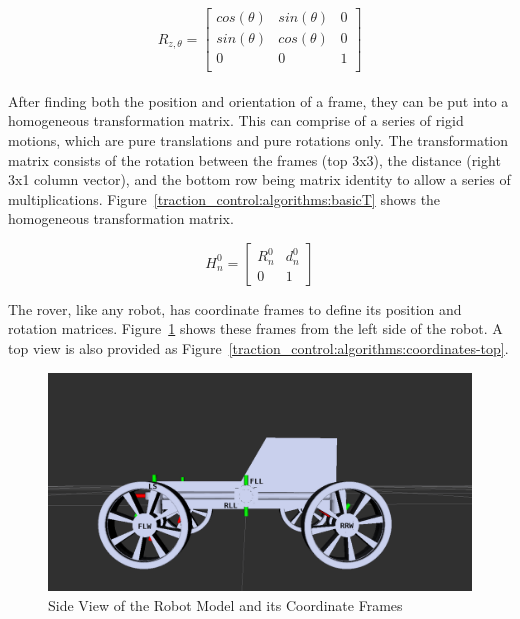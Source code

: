 \begin{equation}
	R_{z,\theta} = \left[\begin{array}{ccc}
		cos(\theta) & sin(\theta) & 0 \\
		sin(\theta) & cos(\theta) & 0 \\
		0 & 0 & 1 \\
	 
	\end{array}\right]
	\label{traction_control:algorithms:rz}
\end{equation}\\

After finding both the position and orientation of a frame, they can be put into a homogeneous transformation matrix. This can comprise of a series of rigid motions, which are pure translations and pure rotations only. The transformation matrix consists of the rotation between the frames (top 3x3), the distance (right 3x1 column vector), and the bottom row being matrix identity to allow a series of multiplications. Figure~\ref{traction_control:algorithms:basicT} shows the homogeneous transformation matrix. 

\begin{equation}
	H^{0}_{n} = \left[\begin{array}{cc}
			R^{0}_{n} & d^{0}_{n}\\
			0 & 1 
			\end{array}\right]
		\label{traction_control:algorithms:basicT}
\end{equation}


The rover, like any robot, has coordinate frames to define its position and rotation matrices.
 Figure~\ref{traction_control:algorithms:coordinates-side} shows these frames from the left side of the robot. A top view is also provided as Figure~\ref{traction_control:algorithms:coordinates-top}.

\begin{figure}[H]
	\centering
	\includegraphics[scale=0.35, width=.7\textwidth]{sections/algorithms/images/srr_side.png}
	\caption{Side View of the Robot Model and its Coordinate Frames}
	\label{traction_control:algorithms:coordinates-side}
\end{figure}
 
